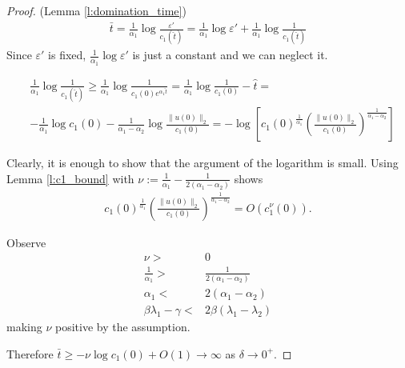 \documentclass[10pt,a4paper]{amsart}
\begin{document}
\begin{proof}(Lemma \ref{l:domination_time})
	\begin{align*}
		\bar{t}=\frac{1}{\alpha_1} \log \frac{\varepsilon'}{c_1(\hat{t})}=\frac{1}{\alpha_1} \log \varepsilon' +\frac{1}{\alpha_1} \log \frac{1}{c_1(\hat{t})}
	\end{align*}
	Since $\varepsilon'$ is fixed, $\frac{1}{\alpha_1} \log \varepsilon'$ is just a constant and we can neglect it.	
	
	\begin{align*}
		&\frac{1}{\alpha_1} \log \frac{1}{c_1(\hat{t})} \geq \frac{1}{\alpha_1} \log \frac{1}{c_1(0)e^{\alpha_1\hat{t}}}=\frac{1}{\alpha_1} \log \frac{1}{c_1(0)}-\hat{t}=\\
		&-\frac{1}{\alpha_1} \log c_1(0)-\frac{1}{\alpha_1-\alpha_2}\log \frac{\| u(0)\|_2}{c_1(0)}=-\log\left[ c_1(0)^{\frac{1}{\alpha_1}} \left(\frac{\|u(0) \|_2}{c_1(0)}\right)^{\frac{1}{\alpha_1-\alpha_2}} \right]
	\end{align*}
	
	Clearly, it is enough to show that the argument of the logarithm is small. Using Lemma \ref{l:c1_bound} with $\nu:=\frac{1}{\alpha_1}-\frac{1}{2(\alpha_1-\alpha_2)}$ shows
	\begin{align*}
		c_1(0)^{\frac{1}{\alpha_1}} \left(\frac{\|u(0) \|_2}{c_1(0)}\right)^{\frac{1}{\alpha_1-\alpha_2}} = O \left( c_1^{\nu}(0) \right).
	\end{align*}
	
	Observe
	\begin{align*}
		\nu >& 0 \\
		\frac{1}{\alpha_1} >& \frac{1}{2(\alpha_1-\alpha_2)} \\
		\alpha_1 <& 2(\alpha_1-\alpha_2) \\
		\beta \lambda_1-\gamma<&2\beta(\lambda_1-\lambda_2) 
	\end{align*}
	making $\nu$ positive by the assumption.
	
	Therefore $\bar{t} \geq -\nu \log c_1(0)+O(1) \to \infty$ as $\delta \to 0^+.$ 
\end{proof}
\end{document}
